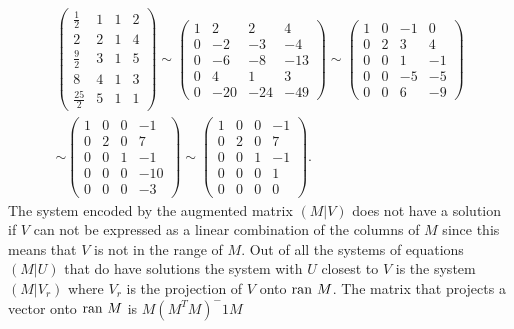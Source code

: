 \documentclass[12pt]{article}
\begin{document}
\begin{gather*}
\left( \begin{array}{rrr|c}
\frac12 &1&1&2\\
2&2&1&4\\
\frac92 &3&1&5\\
8&4&1&3\\
\frac{25}{2} &5&1&1
\end{array} \right)
\sim 
\left( \begin{array}{rrr|r}
1 &2&2&4\\
0      &-2&-3&-4\\
0&-6&-8&-13\\
0&4&1&3\\
0&-20&-24&-49
\end{array} \right)
%
\sim 
\left( \begin{array}{rrr|r}
1 &0&-1&0\\
0      &2&3&4\\
0&0&1&-1\\
0&0&-5&-5\\
0&0&6&-9
\end{array} \right)
\\
\sim 
\left( \begin{array}{rrr|r}
1 &0&0&-1\\
0      &2&0&7\\
0&0&1&-1\\
0&0&0&-10\\
0&0&0&-3
\end{array} \right)
\sim 
\left( \begin{array}{rrr|r}
1 &0&0&-1\\
0      &2&0&7\\
0&0&1&-1\\
0&0&0&1\\
0&0&0&0
\end{array} \right).
\end{gather*}
The system encoded by the augmented matrix $(M|V)$ does not have a solution if $V$ can not be expressed as a linear combination of the columns of $M$ since this means that $V$ is not in the range of $M$. 
Out of all the systems of equations $(M|U)$ that do have solutions the system with $U$ closest to $V$ is the system $(M|V_r)$ where $V_r$ is the projection of 
$V$ onto ${\rm ran~} M$. The matrix that projects a vector onto ${\rm ran~} M$ is 
$M(M^TM)^-1 M $
\end{document}
